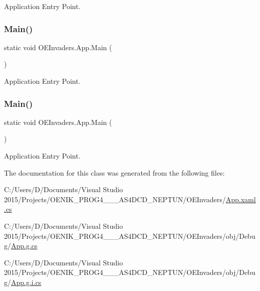 Application Entry Point. 

\mbox{\label{class_o_e_invaders_1_1_app_a3694083a40beddc8b8a0090b8ae78d42}} 
\subsubsection{\texorpdfstring{Main()}{Main()}\hspace{0.1cm}{\footnotesize\ttfamily [3/4]}}
{\footnotesize\ttfamily static void O\+E\+Invaders.\+App.\+Main (\begin{DoxyParamCaption}{ }\end{DoxyParamCaption})\hspace{0.3cm}{\ttfamily [static]}}



Application Entry Point. 

\mbox{\label{class_o_e_invaders_1_1_app_a3694083a40beddc8b8a0090b8ae78d42}} 
\subsubsection{\texorpdfstring{Main()}{Main()}\hspace{0.1cm}{\footnotesize\ttfamily [4/4]}}
{\footnotesize\ttfamily static void O\+E\+Invaders.\+App.\+Main (\begin{DoxyParamCaption}{ }\end{DoxyParamCaption})\hspace{0.3cm}{\ttfamily [static]}}



Application Entry Point. 



The documentation for this class was generated from the following files\+:\begin{DoxyCompactItemize}
\item 
C\+:/\+Users/\+D/\+Documents/\+Visual Studio 2015/\+Projects/\+O\+E\+N\+I\+K\+\_\+\+P\+R\+O\+G4\+\_\+\_\+\_\+\+A\+S4\+D\+C\+D\+\_\+\+N\+E\+P\+T\+U\+N/\+O\+E\+Invaders/\mbox{\hyperlink{_app_8xaml_8cs}{App.\+xaml.\+cs}}\item 
C\+:/\+Users/\+D/\+Documents/\+Visual Studio 2015/\+Projects/\+O\+E\+N\+I\+K\+\_\+\+P\+R\+O\+G4\+\_\+\_\+\_\+\+A\+S4\+D\+C\+D\+\_\+\+N\+E\+P\+T\+U\+N/\+O\+E\+Invaders/obj/\+Debug/\mbox{\hyperlink{_debug_2_app_8g_8cs}{App.\+g.\+cs}}\item 
C\+:/\+Users/\+D/\+Documents/\+Visual Studio 2015/\+Projects/\+O\+E\+N\+I\+K\+\_\+\+P\+R\+O\+G4\+\_\+\_\+\_\+\+A\+S4\+D\+C\+D\+\_\+\+N\+E\+P\+T\+U\+N/\+O\+E\+Invaders/obj/\+Debug/\mbox{\hyperlink{_debug_2_app_8g_8i_8cs}{App.\+g.\+i.\+cs}}\end{DoxyCompactItemize}
